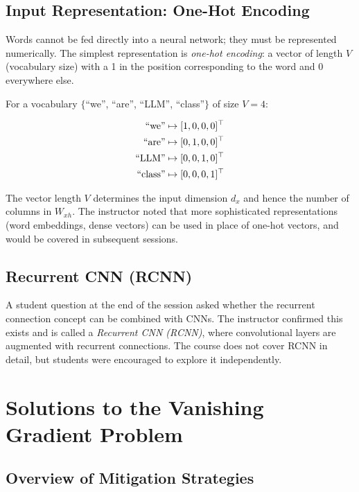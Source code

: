 \documentclass[12pt,a4paper]{article}
\newcommand{\Wxh}{W_{xh}}
\begin{document}
\subsection{Input Representation: One-Hot Encoding}
\label{subsec:one_hot}

Words cannot be fed directly into a neural network; they must be represented
numerically.  The simplest representation is \emph{one-hot encoding}: a vector
of length $V$ (vocabulary size) with a 1 in the position corresponding to the
word and 0 everywhere else.

For a vocabulary $\{$``we'', ``are'', ``LLM'', ``class''$\}$ of size $V=4$:

\begin{align}
  \text{``we''}   &\mapsto [1, 0, 0, 0]^\top \notag \\
  \text{``are''}  &\mapsto [0, 1, 0, 0]^\top \notag \\
  \text{``LLM''}  &\mapsto [0, 0, 1, 0]^\top \notag \\
  \text{``class''}&\mapsto [0, 0, 0, 1]^\top \notag
\end{align}

The vector length $V$ determines the input dimension $d_x$ and hence the number
of columns in $\Wxh$.  The instructor noted that more sophisticated
representations (word embeddings, dense vectors) can be used in place of
one-hot vectors, and would be covered in subsequent sessions.

\subsection{Recurrent CNN (RCNN)}
\label{subsec:rcnn}

A student question at the end of the session asked whether the recurrent
connection concept can be combined with CNNs.  The instructor confirmed this
exists and is called a \emph{Recurrent CNN (RCNN)}, where convolutional layers
are augmented with recurrent connections.  The course does not cover RCNN in
detail, but students were encouraged to explore it independently.

\section{Solutions to the Vanishing Gradient Problem}
\label{sec:solutions}

\subsection{Overview of Mitigation Strategies}
\label{subsec:solutions_overview}
\end{document}

